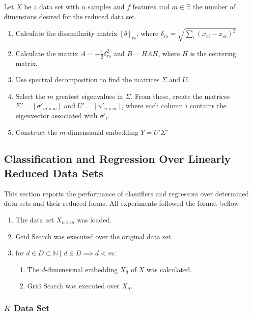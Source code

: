 \documentclass[12pt]{article}
\begin{document}
Let $X$ be a data set with $n$ samples and $f$ features and $m\in\mathbb{R}$ the number of dimensions desired for the reduced data set. \cite{cox2001}

\begin{enumerate}
	\item Calculate the dissimilarity matrix $[\delta]_{rs}$, where $\delta_{rs} = \sqrt{\sum_i (x_{ri} - x_{si})^2}$
	\item Calculate the matrix $A=-\frac{1}{2}\delta_{rs}^2$ and $B=HAH$, where $H$ is the centering matrix.

	\item Use spectral decomposition to find the matrices $\Sigma$ and $U$.

	\item Select the $m$ greatest eigenvalues in $\Sigma$. From these, create the matrices $\Sigma'=[\sigma'_{m\times m}]$ and $U'=[u'_{n\times m}]$, where each column $i$ contains the eigenvector associated with $\sigma'_i$.

	\item Construct the $m$-dimensional embedding $Y=U'\Sigma'$
\end{enumerate}

\subsection{Classification and Regression Over Linearly Reduced Data Sets}
\label{sec:experiments_linear_ds}

This section reports the performance of classifiers and regressors over determined data sets and their reduced forms. All experiments followed the format bellow:

\begin{enumerate}
	\item The data set $X_{n \times m}$ was loaded.
	\item Grid Search was executed over the original data set.
	\item for $d \in D \subset \mathbb{N} \mid d \in D \implies d < m$:
	\begin{enumerate}
		\item The $d$-dimensional embedding $X_d$ of $X$ was calculated.
		\item Grid Search was executed over $X_d$.
	\end{enumerate}
\end{enumerate}

\subsubsection{$K$ Data Set}
\end{document}
